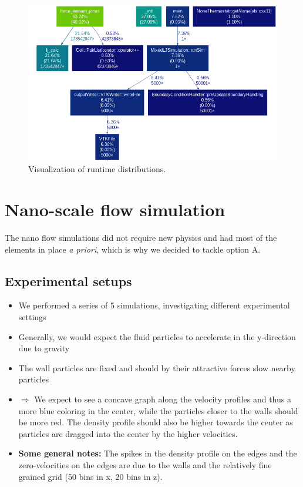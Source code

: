 \documentclass{article}
\begin{document}
\begin{figure}[H]
    \centering
    \includegraphics[width=1\textwidth]{../../res/optimized.png}
    \caption{Visualization of runtime distributions.}
    \label{fig:runtime}
\end{figure}

\section{Nano-scale flow simulation}
\label{sec:nano}

The nano flow simulations did not require new physics and had most of the elements in place \textit{a priori}, which is why we decided to tackle option A.

\subsection{Experimental setups}
\label{sec:nano:exp}

    \begin{itemize}
        \item We performed a series of 5 simulations, investigating different experimental settings
        \item Generally, we would expect the fluid particles to accelerate in the y-direction due to gravity
        \item The wall particles are fixed and should by their attractive forces slow nearby particles
        \item[] \!\!\!\!\!\!\!\!\! $\Rightarrow$ We expect to see a concave graph along the velocity profiles and thus a more blue coloring in the center, while the particles closer to the walls should be more red. The density profile should also be higher towards the center as particles are dragged into the center by the higher velocities.
        \item \textbf{Some general notes:} The spikes in the density profile on the edges and the zero-velocities on the edges are due to the walls and the relatively fine grained grid (50 bins in x, 20 bins in z).
    \end{itemize}
\end{document}
